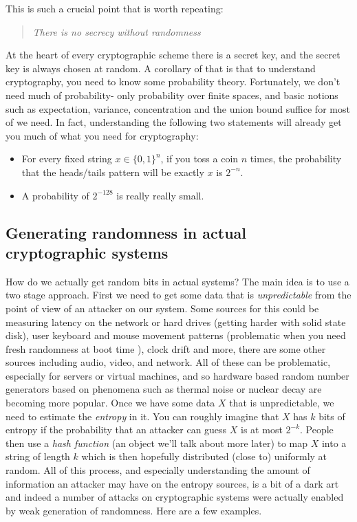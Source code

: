 This is such a crucial point that is worth repeating:

\begin{quote}
\emph{There is no secrecy without randomness}
\end{quote}

At the heart of every cryptographic scheme there is a secret key, and
the secret key is always chosen at random. A corollary of that is that
to understand cryptography, you need to know some probability theory.
Fortunately, we don't need much of probability- only probability over
finite spaces, and basic notions such as expectation, variance,
concentration and the union bound suffice for most of we need. In fact,
understanding the following two statements will already get you much of
what you need for cryptography:

\begin{itemize}
\item
  For every fixed string \(x\in\{0,1\}^n\), if you toss a coin \(n\)
  times, the probability that the heads/tails pattern will be exactly
  \(x\) is \(2^{-n}\).
\item
  A probability of \(2^{-128}\) is really really small.
\end{itemize}

\subsection{Generating randomness in actual cryptographic
systems}\label{Generating-randomness-in-}

How do we actually get random bits in actual systems? The main idea is
to use a two stage approach. First we need to get some data that is
\emph{unpredictable} from the point of view of an attacker on our
system. Some sources for this could be measuring latency on the network
or hard drives (getting harder with solid state disk), user keyboard and
mouse movement patterns (problematic when you need fresh randomness at
boot time ), clock drift and more, there are some other sources
including audio, video, and network. All of these can be problematic,
especially for servers or virtual machines, and so hardware based random
number generators based on phenomena such as thermal noise or nuclear
decay are becoming more popular. Once we have some data \(X\) that is
unpredictable, we need to estimate the \emph{entropy} in it. You can
roughly imagine that \(X\) has \(k\) bits of entropy if the probability
that an attacker can guess \(X\) is at most \(2^{-k}\). People then use
a \emph{hash function} (an object we'll talk about more later) to map
\(X\) into a string of length \(k\) which is then hopefully distributed
(close to) uniformly at random. All of this process, and especially
understanding the amount of information an attacker may have on the
entropy sources, is a bit of a dark art and indeed a number of attacks
on cryptographic systems were actually enabled by weak generation of
randomness. Here are a few examples.

